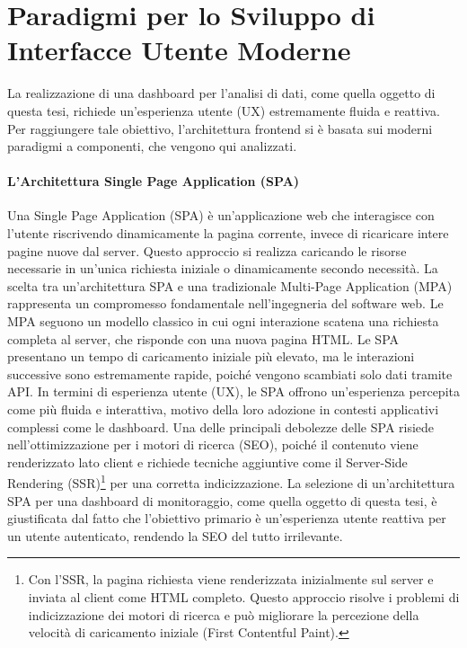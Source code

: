 \documentclass[12pt,a4paper,openright,twoside]{book}
\begin{document}
\section{Paradigmi per lo Sviluppo di Interfacce Utente Moderne}

La realizzazione di una dashboard per l'analisi di dati, come quella oggetto di questa tesi, richiede un'esperienza utente (UX) estremamente fluida e reattiva. Per raggiungere tale obiettivo, l'architettura frontend si è basata sui moderni paradigmi a componenti, che vengono qui analizzati.

\paragraph{L'Architettura Single Page Application (SPA)}

Una Single Page Application (SPA) è un'applicazione web che interagisce con l'utente riscrivendo dinamicamente la pagina corrente, invece di ricaricare intere pagine nuove dal server. Questo approccio si realizza caricando le risorse necessarie in un'unica richiesta iniziale o dinamicamente secondo necessità. La scelta tra un'architettura SPA e una tradizionale Multi-Page Application (MPA) rappresenta un compromesso fondamentale nell'ingegneria del software web. Le MPA seguono un modello classico in cui ogni interazione scatena una richiesta completa al server, che risponde con una nuova pagina HTML. Le SPA presentano un tempo di caricamento iniziale più elevato, ma le interazioni successive sono estremamente rapide, poiché vengono scambiati solo dati tramite API. In termini di esperienza utente (UX), le SPA offrono un'esperienza percepita come più fluida e interattiva, motivo della loro adozione in contesti applicativi complessi come le dashboard. Una delle principali debolezze delle SPA risiede nell'ottimizzazione per i motori di ricerca (SEO), poiché il contenuto viene renderizzato lato client e richiede tecniche aggiuntive come il Server-Side Rendering (SSR)\footnote{Con l'SSR, la pagina richiesta viene renderizzata inizialmente sul server e inviata al client come HTML completo. Questo approccio risolve i problemi di indicizzazione dei motori di ricerca e può migliorare la percezione della velocità di caricamento iniziale (First Contentful Paint).} per una corretta indicizzazione. La selezione di un'architettura SPA per una dashboard di monitoraggio, come quella oggetto di questa tesi, è giustificata dal fatto che l'obiettivo primario è un'esperienza utente reattiva per un utente autenticato, rendendo la SEO del tutto irrilevante.
\end{document}
